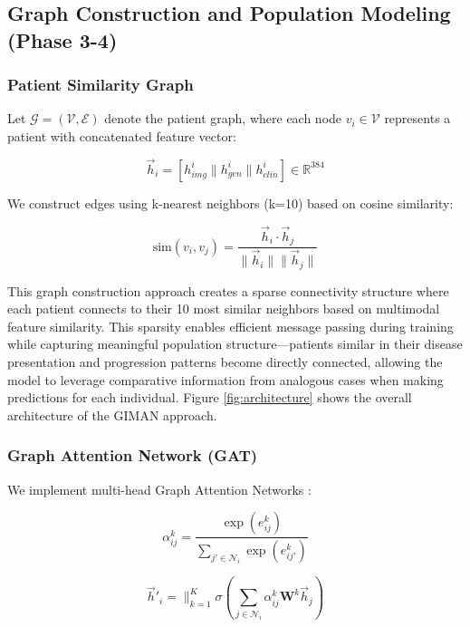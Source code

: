 \documentclass[journal,twoside,web]{ieeecolor}
\begin{document}
\subsection{Graph Construction and Population Modeling (Phase 3-4)}

\subsubsection{Patient Similarity Graph}
Let $\mathcal{G} = (\mathcal{V}, \mathcal{E})$ denote the patient graph, where each node $v_i \in \mathcal{V}$ represents a patient with concatenated feature vector:

\begin{equation}
\vec{h}_i = [h_{img}^i \| h_{gen}^i \| h_{clin}^i] \in \mathbb{R}^{384}
\end{equation}

We construct edges using k-nearest neighbors (k=10) based on cosine similarity:

\begin{equation}
\text{sim}(v_i, v_j) = \frac{\vec{h}_i \cdot \vec{h}_j}{\|\vec{h}_i\| \|\vec{h}_j\|}
\end{equation}

This graph construction approach creates a sparse connectivity structure where each patient connects to their 10 most similar neighbors based on multimodal feature similarity. This sparsity enables efficient message passing during training while capturing meaningful population structure---patients similar in their disease presentation and progression patterns become directly connected, allowing the model to leverage comparative information from analogous cases when making predictions for each individual. Figure \ref{fig:architecture} shows the overall architecture of the GIMAN approach.

\subsubsection{Graph Attention Network (GAT)}
We implement multi-head Graph Attention Networks \cite{velickovic2018graph}:

\begin{equation}
\alpha_{ij}^k = \frac{\exp(e_{ij}^k)}{\sum_{j' \in \mathcal{N}_i} \exp(e_{ij'}^k)}
\end{equation}

\begin{equation}
\vec{h}'_i = \|_{k=1}^K \sigma\left(\sum_{j \in \mathcal{N}_i} \alpha_{ij}^k \mathbf{W}^k\vec{h}_j\right)
\end{equation}
\end{document}
